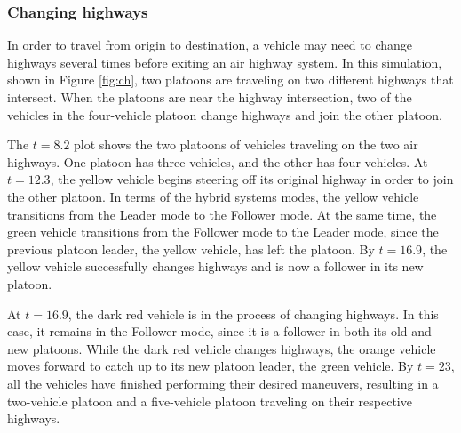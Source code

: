 \subsubsection{Changing highways}
In order to travel from origin to destination, a vehicle may need to change highways several times before exiting an air highway system. In this simulation, shown in Figure \ref{fig:ch}, two platoons are traveling on two different highways that intersect. When the platoons are near the highway intersection, two of the vehicles in the four-vehicle platoon change highways and join the other platoon.

The $t=8.2$ plot shows the two platoons of vehicles traveling on the two air highways. One platoon has three vehicles, and the other has four vehicles. At $t=12.3$, the yellow vehicle begins steering off its original highway in order to join the other platoon. In terms of the hybrid systems modes, the yellow vehicle transitions from the Leader mode to the Follower mode. At the same time, the green vehicle transitions from the Follower mode to the Leader mode, since the previous platoon leader, the yellow vehicle, has left the platoon. By $t=16.9$, the yellow vehicle successfully changes highways and is now a follower in its new platoon.

At $t=16.9$, the dark red vehicle is in the process of changing highways. In this case, it remains in the Follower mode, since it is a follower in both its old and new platoons. While the dark red vehicle changes highways, the orange vehicle moves forward to catch up to its new platoon leader, the green vehicle. By $t=23$, all the vehicles have finished performing their desired maneuvers, resulting in a two-vehicle platoon and a five-vehicle platoon traveling on their respective highways.


